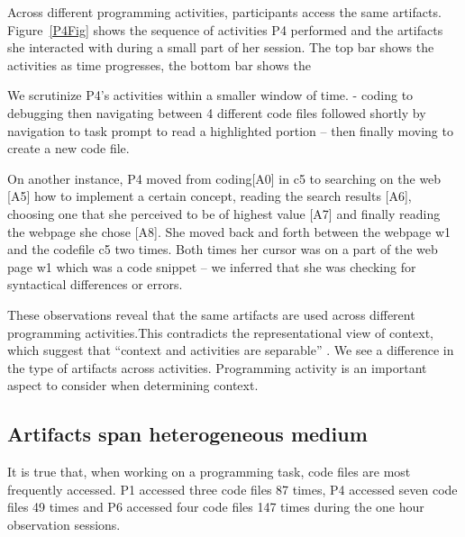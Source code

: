 Across different programming activities, participants access the same artifacts. Figure~\ref{P4Fig} shows the sequence of activities P4 performed and the artifacts she interacted with during a small part of her session. The top bar shows the activities as time progresses, the bottom bar shows the   

We scrutinize P4's activities within a smaller window of time.
- coding to debugging then navigating between 4 different code files followed shortly by navigation to task prompt to read a highlighted portion -- then finally moving to create a new code file.




On another instance, P4 moved from coding[A0] in c5 to searching on the web [A5] how to implement a certain concept, reading the search results [A6], choosing one that she perceived to be of highest value [A7] and finally reading the webpage she chose [A8]. She moved back and forth between the webpage w1 and the codefile c5 two times. Both times her cursor was on a part of the web page w1 which was a code snippet -- we inferred that she was checking for syntactical differences or errors. 

These observations reveal that the same artifacts are used across different programming activities.This contradicts the representational view of context, which suggest that ``context and activities are separable'' \cite{Dourish:2004,Gasparic:2017}. We see a difference in the type of artifacts across activities. Programming activity is an important aspect to consider when determining context. 

\subsection{Artifacts span heterogeneous medium}

It is true that, when working on a programming task, code files are most frequently accessed. P1 accessed three code files 87 times, P4 accessed seven code files 49 times and P6 accessed four code files 147 times during the one hour observation sessions.

